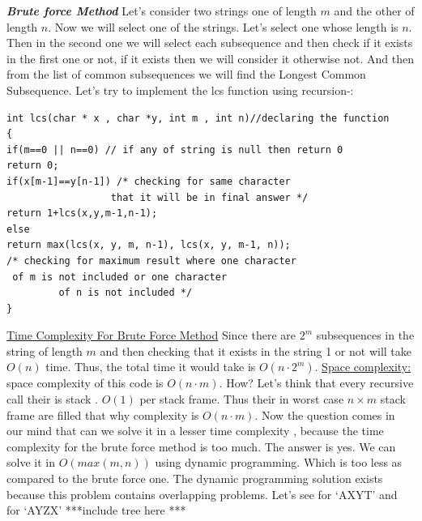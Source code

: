 \documentclass[12pt]{book}
\begin{document}
\textbf{\textit{Brute force Method}}\newline
Let’s consider two strings one of length $m$ and the other of length $n$.\newline
Now we will select one of the strings. Let's select one whose length is $n$. Then in the second one we will select each subsequence and then check if it exists in the first one or not, if it exists then we will consider it otherwise not. And then from the list of common subsequences we will find the Longest Common Subsequence.\newline\newline
Let’s try to implement the lcs function using recursion-:
\begin{lstlisting}
int lcs(char * x , char *y, int m , int n)//declaring the function
{
if(m==0 || n==0) // if any of string is null then return 0
return 0;
if(x[m-1]==y[n-1]) /* checking for same character
                  that it will be in final answer */
return 1+lcs(x,y,m-1,n-1);
else
return max(lcs(x, y, m, n-1), lcs(x, y, m-1, n));
/* checking for maximum result where one character
 of m is not included or one character
         of n is not included */
}
\end{lstlisting}
\underline{Time Complexity For Brute Force Method}\newline
Since there are $2^m$ subsequences in the string of length $m$ and then checking that it exists in the string 1 or not will take $O(n)$ time. Thus, the total time it would take is $O(n \cdot 2^m)$.\newline\newline
\underline{Space complexity:}\newline
space complexity of this code is $O(n \cdot m)$. How?\newline
Let’s think that every recursive call their is stack . $O(1)$ per stack frame. Thus their in worst case $n \times m$ stack frame are filled that why complexity is $O(n \cdot m)$.\newline\newline
 Now the question comes in our mind that can we solve it in a lesser time complexity , because the time complexity for the brute force method is too much. The answer is yes. We can solve it in $O(max(m, n))$ using dynamic programming. Which is too less as compared to the brute force one.\newline
The dynamic programming solution exists because this problem contains overlapping problems.\newline\newline
Let’s see for ‘AXYT’ and for ‘AYZX’\newline
***include tree here ***\newline
\end{document}
